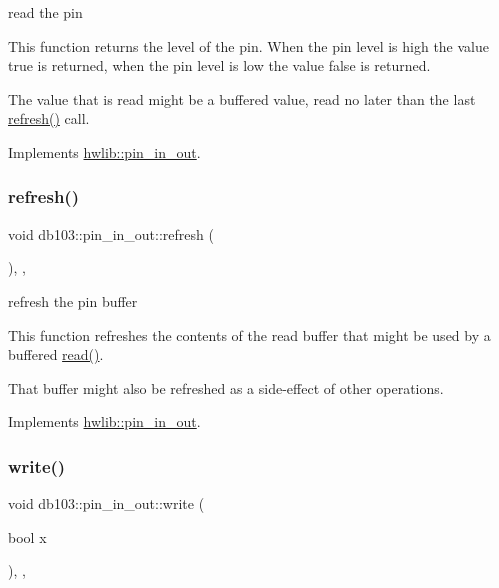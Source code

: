 read the pin

This function returns the level of the pin. When the pin level is high the value true is returned, when the pin level is low the value false is returned.

The value that is read might be a buffered value, read no later than the last \hyperlink{classdb103_1_1pin__in__out_a62907588942315bdfe8d467dadc22ed7}{refresh()} call. 

Implements \hyperlink{classhwlib_1_1pin__in__out_a5caebc7ab9fe49b7e020b89f0a2cf892}{hwlib\+::pin\+\_\+in\+\_\+out}.

\mbox{\label{classdb103_1_1pin__in__out_a62907588942315bdfe8d467dadc22ed7}} 
\subsubsection{\texorpdfstring{refresh()}{refresh()}}
{\footnotesize\ttfamily void db103\+::pin\+\_\+in\+\_\+out\+::refresh (\begin{DoxyParamCaption}{ }\end{DoxyParamCaption})\hspace{0.3cm}{\ttfamily [inline]}, {\ttfamily [override]}, {\ttfamily [virtual]}}

refresh the pin buffer

This function refreshes the contents of the read buffer that might be used by a buffered \hyperlink{classdb103_1_1pin__in__out_a67a48a90485305275ce4573f5e371f6a}{read()}.

That buffer might also be refreshed as a side-\/effect of other operations. 

Implements \hyperlink{classhwlib_1_1pin__in__out_a8815baac4e5193ec68795956f5e363a6}{hwlib\+::pin\+\_\+in\+\_\+out}.

\mbox{\label{classdb103_1_1pin__in__out_a45dcb3f770c432ece4374fcc428ee2e7}} 
\subsubsection{\texorpdfstring{write()}{write()}}
{\footnotesize\ttfamily void db103\+::pin\+\_\+in\+\_\+out\+::write (\begin{DoxyParamCaption}\item[{bool}]{x }\end{DoxyParamCaption})\hspace{0.3cm}{\ttfamily [inline]}, {\ttfamily [override]}, {\ttfamily [virtual]}}

